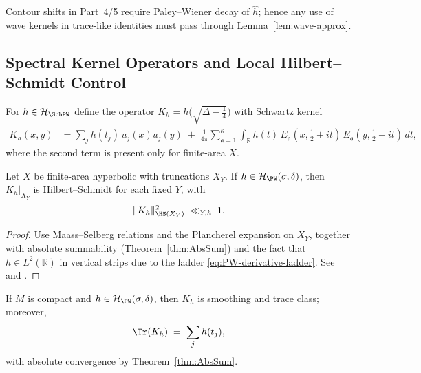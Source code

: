 \begin{remark} %
Contour shifts in Part~4/5 require Paley–Wiener decay of $\widehat{h}$; hence any use of wave kernels in trace-like identities must pass through Lemma~\ref{lem:wave-approx}. %
\end{remark}

\subsection{Spectral Kernel Operators and Local Hilbert–Schmidt Control} \label{subsec:spectral-kernels} %

\begin{definition} \label{def:spectral-kernel} %
For $h\in\mathcal{H}_{\SchPW}$ define the operator $K_h=h\!\big(\sqrt{\Delta-\tfrac14}\big)$ with Schwartz kernel
\begin{align}
  K_h(x,y)
  &= \sum_{j} h(t_j)\,u_j(x)\overline{u_j(y)}
   \;+\; \frac{1}{4\pi}\sum_{\mathfrak a=1}^{\kappa}\int_{\mathbb R} h(t)\,
      E_{\mathfrak a}(x,\tfrac12+it)\,\overline{E_{\mathfrak a}(y,\tfrac12+it)}\,dt,
      \label{eq:Kh-kernel} %
\end{align}
where the second term is present only for finite-area $X$. %
\end{definition}

\begin{lemma} \label{lem:HS-truncations} %
Let $X$ be finite-area hyperbolic with truncations $X_Y$. If $h\in\mathcal{H}_{\PW}(\sigma,\delta)$, then $K_h|_{X_Y}$ is Hilbert–Schmidt for each fixed $Y$, with
\[
  \|K_h\|_{\HS(X_Y)}^2 \;\ll_{Y,h}\; 1. %
\]
\end{lemma}

\begin{proof}
Use Maass–Selberg relations and the Plancherel expansion on $X_Y$, together with absolute summability (Theorem~\ref{thm:AbsSum}) and the fact that $h\in L^2(\mathbb R)$ in vertical strips due to the ladder \eqref{eq:PW-derivative-ladder}. See \cite[Ch.~3]{HejhalII} and \cite{LaxPhillips}. %
\end{proof}

\begin{proposition} \label{prop:trace-class-compact} %
If $M$ is compact and $h\in\mathcal{H}_{\PW}(\sigma,\delta)$, then $K_h$ is smoothing and trace class; moreover,
\[
  \Tr(K_h) \;=\; \sum_{j} h(t_j), %
\]
with absolute convergence by Theorem~\ref{thm:AbsSum}. %
\end{proposition}

